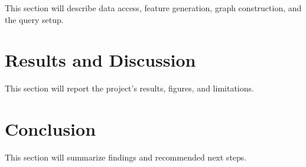\documentclass[11pt]{article}
\begin{document}
This section will describe data access, feature generation, graph construction, and the query setup.

\section{Results and Discussion}

This section will report the project’s results, figures, and limitations.

\section{Conclusion}

This section will summarize findings and recommended next steps.



\end{document}
